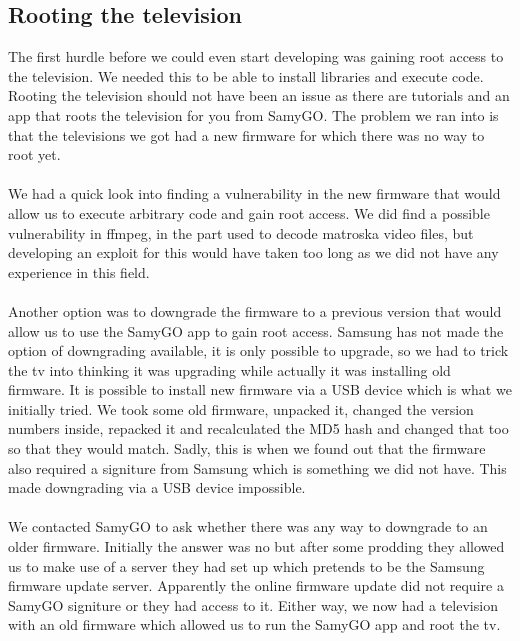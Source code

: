\subsection{Rooting the television}
The first hurdle before we could even start developing was gaining root access to the television. We needed this to be able to install libraries and execute code. Rooting the television should not have been an issue as there are tutorials and an app that roots the television for you from SamyGO\cite{SamyGO}. The problem we ran into is that the televisions we got had a new firmware for which there was no way to root yet.
\\\\
We had a quick look into finding a vulnerability in the new firmware that would allow us to execute arbitrary code and gain root access. We did find a possible vulnerability in ffmpeg, in the part used to decode matroska video files, but developing an exploit for this would have taken too long as we did not have any experience in this field.
\\\\
Another option was to downgrade the firmware to a previous version that would allow us to use the SamyGO app to gain root access. Samsung has not made the option of downgrading available, it is only possible to upgrade, so we had to trick the tv into thinking it was upgrading while actually it was installing old firmware. It is possible to install new firmware via a USB device which is what we initially tried. We took some old firmware, unpacked it, changed the version numbers inside, repacked it and recalculated the MD5 hash and changed that too so that they would match. Sadly, this is when we found out that the firmware also required a signiture from Samsung which is something we did not have. This made downgrading via a USB device impossible.
\\\\
We contacted SamyGO to ask whether there was any way to downgrade to an older firmware. Initially the answer was no but after some prodding they allowed us to make use of a server they had set up which pretends to be the Samsung firmware update server. Apparently the online firmware update did not require a SamyGO signiture or they had access to it. Either way, we now had a television with an old firmware which allowed us to run the SamyGO app and root the tv.


